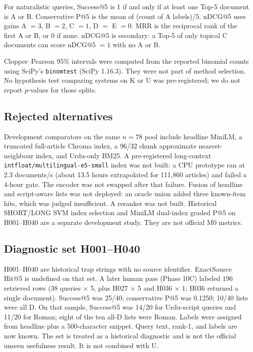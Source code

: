 \documentclass[10pt,letterpaper]{article}
\begin{document}
For naturalistic queries, Success@5 is 1 if and only if at least one Top-5 document is A or B. Conservative P@5 is the mean of (count of A labels)/5. nDCG@5 uses gains A $= 3$, B $= 2$, C $= 1$, D $=$ E $= 0$. MRR is the reciprocal rank of the first A or B, or 0 if none. nDCG@5 is secondary: a Top-5 of only topical C documents can score nDCG@5 $= 1$ with no A or B.

Clopper--Pearson 95\% intervals were computed from the reported binomial counts using SciPy's \texttt{binomtest} (SciPy 1.16.3). They were not part of method selection. No hypothesis test comparing systems on K or U was pre-registered; we do not report $p$-values for those splits.

\subsection*{Rejected alternatives}

Development comparators on the same $n = 78$ pool include headline MiniLM, a truncated full-article Chroma index, a 96/32 chunk approximate nearest-neighbour index, and Urdu-only BM25. A pre-registered long-context \texttt{intfloat/multilingual-e5-small} index was not built: a CPU prototype ran at 2.3 documents/s (about 13.5 hours extrapolated for 111,860 articles) and failed a 4-hour gate. The encoder was not swapped after that failure. Fusion of headline and script-aware lists was not deployed: an oracle union added three known-item hits, which was judged insufficient. A reranker was not built. Historical SHORT/LONG SVM index selection and MiniLM dual-index graded P@5 on H001--H040 are a separate development study. They are not official M0 metrics.

\subsection*{Diagnostic set H001--H040}

H001--H040 are historical trap strings with no source identifier. ExactSource Hit@5 is undefined on that set. A later human pass (Phase 10C) labeled 196 retrieved rows (38 queries $\times$ 5, plus H027 $\times$ 5 and H036 $\times$ 1; H036 returned a single document). Success@5 was 25/40; conservative P@5 was 0.1250; 10/40 lists were all D. On that sample, Success@5 was 14/20 for Urdu-script queries and 11/20 for Roman; eight of the ten all-D lists were Roman. Labels were assigned from headline plus a 500-character snippet. Query text, rank-1, and labels are now known. The set is treated as a historical diagnostic and is not the official unseen usefulness result. It is not combined with U.
\end{document}
